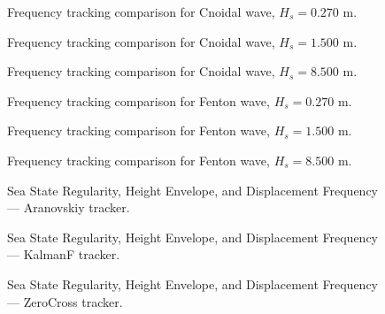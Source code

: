 \documentclass[11pt,letterpaper]{article}
\begin{document}
\begin{figure}[H]\centering
  \resizebox{\textwidth}{!}{}
  \caption{Frequency tracking comparison for Cnoidal wave, $H_s = 0.270$ m.}
  \label{fig:freqtrack_cnoidal_low}
\end{figure}

\begin{figure}[H]\centering
  \resizebox{\textwidth}{!}{}
  \caption{Frequency tracking comparison for Cnoidal wave, $H_s = 1.500$ m.}
  \label{fig:freqtrack_cnoidal_medium}
\end{figure}

\begin{figure}[H]\centering
  \resizebox{\textwidth}{!}{}
  \caption{Frequency tracking comparison for Cnoidal wave, $H_s = 8.500$ m.}
  \label{fig:freqtrack_cnoidal_high}
\end{figure}

\begin{figure}[H]\centering
  \resizebox{\textwidth}{!}{}
  \caption{Frequency tracking comparison for Fenton wave, $H_s = 0.270$ m.}
  \label{fig:freqtrack_fenton_low}
\end{figure}

\begin{figure}[H]\centering
  \resizebox{\textwidth}{!}{}
  \caption{Frequency tracking comparison for Fenton wave, $H_s = 1.500$ m.}
  \label{fig:freqtrack_fenton_medium}
\end{figure}

\begin{figure}[H]\centering
  \resizebox{\textwidth}{!}{}
  \caption{Frequency tracking comparison for Fenton wave, $H_s = 8.500$ m.}
  \label{fig:freqtrack_fenton_high}
\end{figure}


\begin{figure}[H]\centering
  \resizebox{\textwidth}{!}{}
  \caption{Sea State Regularity, Height Envelope, and Displacement Frequency — Aranovskiy tracker.}
  \label{fig:seareg_aranovskiy}
\end{figure}

\begin{figure}[H]\centering
  \resizebox{\textwidth}{!}{}
  \caption{Sea State Regularity, Height Envelope, and Displacement Frequency — KalmanF tracker.}
  \label{fig:seareg_kalmanf}
\end{figure}

\begin{figure}[H]\centering
  \resizebox{\textwidth}{!}{}
  \caption{Sea State Regularity, Height Envelope, and Displacement Frequency — ZeroCross tracker.}
  \label{fig:seareg_zerocross}
\end{figure}
\end{document}
